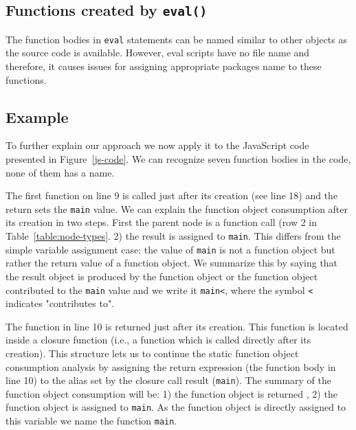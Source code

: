 \documentclass[10pt, preprint]{sigplanconf}
\begin{document}
{\subsection{Functions created by {\large \texttt{eval()}}}
The function bodies in {\small\texttt{eval}} statements can be named similar to other objects as the source code is available. However, eval scripts have no file name and therefore, it causes issues for assigning appropriate packages name to these functions. 



\subsection{Example}
  
To further explain our approach we now apply it to the JavaScript code presented in Figure~\ref{js-code}. We can recognize seven function bodies in the code, none of them has a name. 

The first function on line 9 is called just after its creation (see line 18) and the return sets the {\small\texttt{main}} value. We can explain the function object consumption after its creation in two steps. First the parent node is a function call (row 2 in Table~\ref{table:node-types}. 2) the result is assigned to {\small\texttt{main}}. This differs from the simple variable assignment case: the value of {\small\texttt{main}} is not a function object but rather the return value of a function object.   We summarize this by saying that the result object is produced by the function object or the function object contributed to the {\small\texttt{main}} value and we write it {\small\texttt{main<}}, where the symbol {\small\texttt{<}} indicates "contributes to".

The function in line 10 is returned just after its creation. This function is located inside a closure function (i.e., a function which is called directly after its creation). This structure lets us to continue the static function object consumption analysis by assigning the return expression (the function body in line 10) to the alias set by the closure call result ({\small\texttt{main}}). The summary of the function object consumption will be: 1) the function object is returned , 2) the function object is assigned to {\small\texttt{main}}. As the function object is directly assigned to this variable we name the function {\small\texttt{main}}.

}
\end{document}
